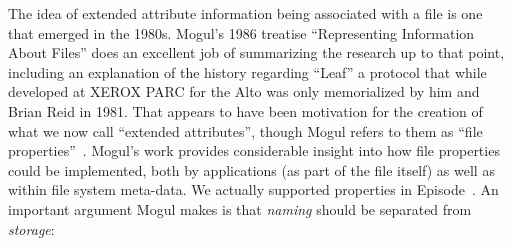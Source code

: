 The idea of extended attribute information being associated with a file is one
that emerged in the 1980s.  Mogul's 1986 treatise ``Representing Information
About Files'' does an excellent job of summarizing the research up to that
point, including an explanation of the history regarding ``Leaf'' a protocol
that while developed at XEROX PARC for the Alto was only memorialized by him and
Brian Reid in 1981.  That appears to have been motivation for the creation of
what we now call ``extended attributes'', though Mogul refers to them as ``file
properties''~\cite{mogul1986representing}. Mogul's work provides considerable
insight into how file properties could be implemented, both by applications (as
part of the file itself) as well as within file system meta-data.  We actually
supported properties in Episode~\cite{chutani1992episode}.  An important argument Mogul
makes is that \emph{naming} should be separated from \emph{storage}:

